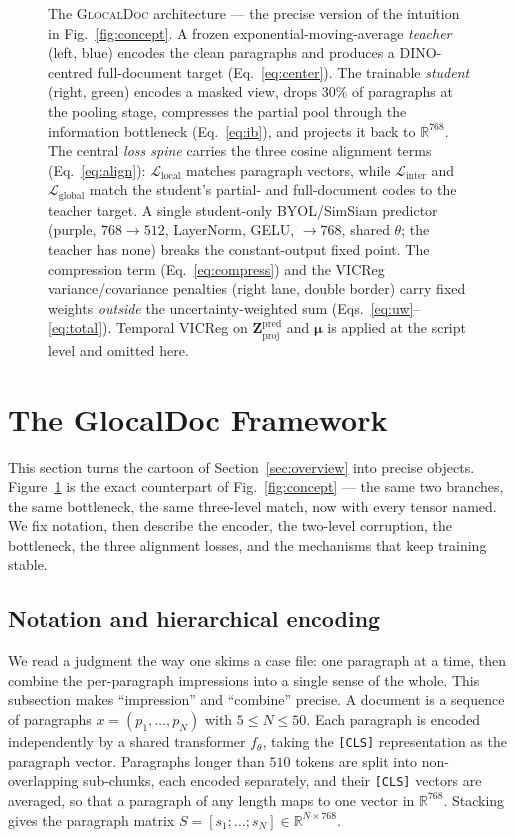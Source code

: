 \documentclass[conference]{IEEEtran}
\newcommand{\glocal}{\textsc{GlocalDoc}}
\begin{document}
\begin{figure}[p]
{\begin{tikzpicture}
\end{tikzpicture}}
\caption{The \glocal{} architecture --- the precise version of the intuition in
Fig.~\ref{fig:concept}. A frozen exponential-moving-average \emph{teacher} (left,
blue) encodes the clean paragraphs and produces a DINO-centred full-document target
(Eq.~\ref{eq:center}). The trainable \emph{student} (right, green) encodes a masked
view, drops $30\%$ of paragraphs at the pooling stage, compresses the partial pool
through the information bottleneck (Eq.~\ref{eq:ib}), and projects it back to
$\mathbb{R}^{768}$. The central \emph{loss spine} carries the three cosine alignment
terms (Eq.~\ref{eq:align}): $\mathcal{L}_{\mathrm{local}}$ matches paragraph vectors,
while $\mathcal{L}_{\mathrm{inter}}$ and $\mathcal{L}_{\mathrm{global}}$ match the
student's partial- and full-document codes to the teacher target. A single
student-only BYOL/SimSiam predictor (purple, $768\!\to\!512$, LayerNorm, GELU,
$\to\!768$, shared $\theta$; the teacher has none) breaks the constant-output fixed
point. The compression term (Eq.~\ref{eq:compress}) and the VICReg
variance/covariance penalties (right lane, double border) carry fixed weights
\emph{outside} the uncertainty-weighted sum (Eqs.~\ref{eq:uw}--\ref{eq:total}).
Temporal VICReg on $\bm{Z}_{\mathrm{proj}}^{\mathrm{pred}}$ and $\bm{\mu}$ is applied
at the script level and omitted here.}
\label{fig:arch}
\end{figure}

\section{The GlocalDoc Framework}
\label{sec:method}
This section turns the cartoon of Section~\ref{sec:overview} into precise objects.
Figure~\ref{fig:arch} is the exact counterpart of Fig.~\ref{fig:concept} --- the same
two branches, the same bottleneck, the same three-level match, now with every tensor
named. We fix notation, then describe the encoder, the two-level corruption, the
bottleneck, the three alignment losses, and the mechanisms that keep training stable.

\subsection{Notation and hierarchical encoding}
We read a judgment the way one skims a case file: one paragraph at a time, then
combine the per-paragraph impressions into a single sense of the whole. This
subsection makes ``impression'' and ``combine'' precise. A document is a sequence of
paragraphs $x = (p_1, \dots, p_N)$ with
$5 \le N \le 50$. Each paragraph is encoded independently by a shared transformer
$f_\theta$, taking the \texttt{[CLS]} representation as the paragraph vector.
Paragraphs longer than $510$ tokens are split into non-overlapping sub-chunks, each
encoded separately, and their \texttt{[CLS]} vectors are averaged, so that a
paragraph of any length maps to one vector in $\mathbb{R}^{768}$. Stacking gives the
paragraph matrix $S = [s_1; \dots; s_N] \in \mathbb{R}^{N \times 768}$.
\end{document}
